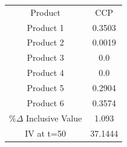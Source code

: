 \begin{tabular}{cc}
Product & CCP \\
Product 1 & 0.3503 \\
Product 2 & 0.0019 \\
Product 3 & 0.0 \\
Product 4 & 0.0 \\
Product 5 & 0.2904 \\
Product 6 & 0.3574 \\
$\%\Delta$ Inclusive Value & 1.093 \\
IV at t=50 & 37.1444 \\
\end{tabular}